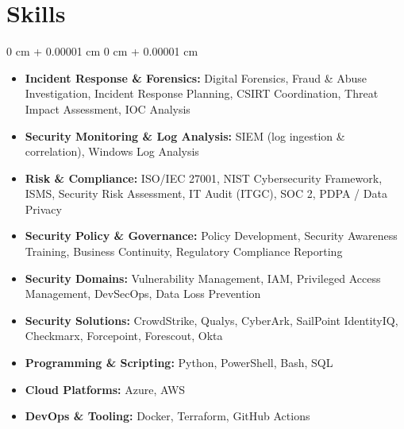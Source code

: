 \documentclass[10pt, letterpaper]{article}
\newenvironment{highlights}{
    \begin{itemize}[
        topsep=0.08 cm,
        parsep=0.08 cm,
        partopsep=0pt,
        itemsep=0.05 cm,
        leftmargin=0 cm + 12pt
    ]
}{
    \end{itemize}
}
\newenvironment{onecolentry}{
    \begin{adjustwidth}{
        0 cm + 0.00001 cm
    }{
        0 cm + 0.00001 cm
    }
}{
    \end{adjustwidth}
}
\begin{document}
    \vspace{0.15 cm}

    \section{Skills}

    \begin{onecolentry}
        \begin{highlights}
            \item \textbf{Incident Response \& Forensics:} Digital Forensics, Fraud \& Abuse Investigation, Incident Response Planning, CSIRT Coordination, Threat Impact Assessment, IOC Analysis
            \item \textbf{Security Monitoring \& Log Analysis:} SIEM (log ingestion \& correlation), Windows Log Analysis
            \item \textbf{Risk \& Compliance:} ISO/IEC 27001, NIST Cybersecurity Framework, ISMS, Security Risk Assessment, IT Audit (ITGC), SOC 2, PDPA / Data Privacy
            \item \textbf{Security Policy \& Governance:} Policy Development, Security Awareness Training, Business Continuity, Regulatory Compliance Reporting
            \item \textbf{Security Domains:} Vulnerability Management, IAM, Privileged Access Management, DevSecOps, Data Loss Prevention
            \item \textbf{Security Solutions:} CrowdStrike, Qualys, CyberArk, SailPoint IdentityIQ, Checkmarx, Forcepoint, Forescout, Okta
            \item \textbf{Programming \& Scripting:} Python, PowerShell, Bash, SQL
            \item \textbf{Cloud Platforms:} Azure, AWS
            \item \textbf{DevOps \& Tooling:} Docker, Terraform, GitHub Actions
        \end{highlights}
    \end{onecolentry}

    \vspace{0.15 cm}
\end{document}
